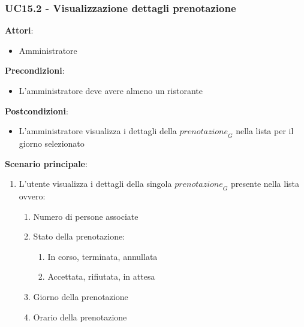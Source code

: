 \subsubsection{UC15.2 - Visualizzazione dettagli prenotazione}\label{usecase:15_2}
\textbf{Attori}:
\begin{itemize}
    \item Amministratore
\end{itemize}
\textbf{Precondizioni}:
\begin{itemize}
    \item L'amministratore deve avere almeno un ristorante
\end{itemize}
\textbf{Postcondizioni}:
\begin{itemize}
    \item L'amministratore visualizza i dettagli della $\textit{prenotazione}_G$ nella lista per il giorno selezionato
\end{itemize}
\textbf{Scenario principale}:
\begin{enumerate}
    \item L'utente visualizza i dettagli della singola $\textit{prenotazione}_G$ presente nella lista ovvero:
    \begin{enumerate}
        \item Numero di persone associate
        \item Stato della prenotazione:
         \begin{enumerate}
           \item In corso, terminata, annullata
            \item Accettata, rifiutata, in attesa
       \end{enumerate}
    \item Giorno della prenotazione
    \item Orario della prenotazione
    \end{enumerate}
\end{enumerate}
\newpage
